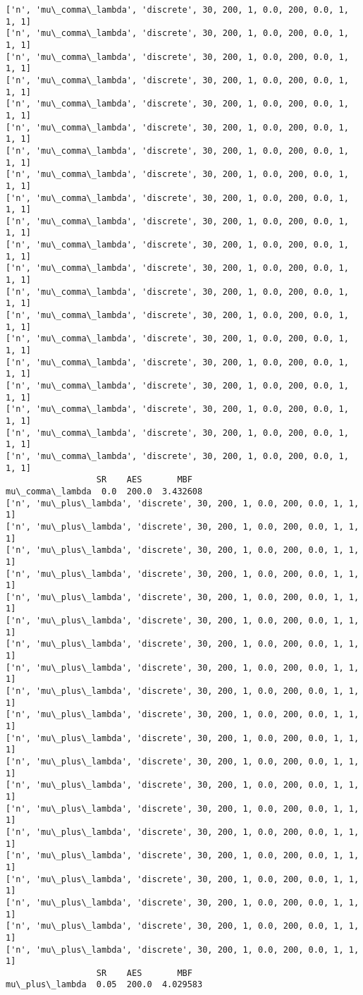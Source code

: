 \documentclass[11pt]{article}
\begin{document}
    \begin{Verbatim}[commandchars=\\\{\}]
['n', 'mu\_comma\_lambda', 'discrete', 30, 200, 1, 0.0, 200, 0.0, 1, 1, 1]
['n', 'mu\_comma\_lambda', 'discrete', 30, 200, 1, 0.0, 200, 0.0, 1, 1, 1]
['n', 'mu\_comma\_lambda', 'discrete', 30, 200, 1, 0.0, 200, 0.0, 1, 1, 1]
['n', 'mu\_comma\_lambda', 'discrete', 30, 200, 1, 0.0, 200, 0.0, 1, 1, 1]
['n', 'mu\_comma\_lambda', 'discrete', 30, 200, 1, 0.0, 200, 0.0, 1, 1, 1]
['n', 'mu\_comma\_lambda', 'discrete', 30, 200, 1, 0.0, 200, 0.0, 1, 1, 1]
['n', 'mu\_comma\_lambda', 'discrete', 30, 200, 1, 0.0, 200, 0.0, 1, 1, 1]
['n', 'mu\_comma\_lambda', 'discrete', 30, 200, 1, 0.0, 200, 0.0, 1, 1, 1]
['n', 'mu\_comma\_lambda', 'discrete', 30, 200, 1, 0.0, 200, 0.0, 1, 1, 1]
['n', 'mu\_comma\_lambda', 'discrete', 30, 200, 1, 0.0, 200, 0.0, 1, 1, 1]
['n', 'mu\_comma\_lambda', 'discrete', 30, 200, 1, 0.0, 200, 0.0, 1, 1, 1]
['n', 'mu\_comma\_lambda', 'discrete', 30, 200, 1, 0.0, 200, 0.0, 1, 1, 1]
['n', 'mu\_comma\_lambda', 'discrete', 30, 200, 1, 0.0, 200, 0.0, 1, 1, 1]
['n', 'mu\_comma\_lambda', 'discrete', 30, 200, 1, 0.0, 200, 0.0, 1, 1, 1]
['n', 'mu\_comma\_lambda', 'discrete', 30, 200, 1, 0.0, 200, 0.0, 1, 1, 1]
['n', 'mu\_comma\_lambda', 'discrete', 30, 200, 1, 0.0, 200, 0.0, 1, 1, 1]
['n', 'mu\_comma\_lambda', 'discrete', 30, 200, 1, 0.0, 200, 0.0, 1, 1, 1]
['n', 'mu\_comma\_lambda', 'discrete', 30, 200, 1, 0.0, 200, 0.0, 1, 1, 1]
['n', 'mu\_comma\_lambda', 'discrete', 30, 200, 1, 0.0, 200, 0.0, 1, 1, 1]
['n', 'mu\_comma\_lambda', 'discrete', 30, 200, 1, 0.0, 200, 0.0, 1, 1, 1]
                  SR    AES       MBF
mu\_comma\_lambda  0.0  200.0  3.432608
['n', 'mu\_plus\_lambda', 'discrete', 30, 200, 1, 0.0, 200, 0.0, 1, 1, 1]
['n', 'mu\_plus\_lambda', 'discrete', 30, 200, 1, 0.0, 200, 0.0, 1, 1, 1]
['n', 'mu\_plus\_lambda', 'discrete', 30, 200, 1, 0.0, 200, 0.0, 1, 1, 1]
['n', 'mu\_plus\_lambda', 'discrete', 30, 200, 1, 0.0, 200, 0.0, 1, 1, 1]
['n', 'mu\_plus\_lambda', 'discrete', 30, 200, 1, 0.0, 200, 0.0, 1, 1, 1]
['n', 'mu\_plus\_lambda', 'discrete', 30, 200, 1, 0.0, 200, 0.0, 1, 1, 1]
['n', 'mu\_plus\_lambda', 'discrete', 30, 200, 1, 0.0, 200, 0.0, 1, 1, 1]
['n', 'mu\_plus\_lambda', 'discrete', 30, 200, 1, 0.0, 200, 0.0, 1, 1, 1]
['n', 'mu\_plus\_lambda', 'discrete', 30, 200, 1, 0.0, 200, 0.0, 1, 1, 1]
['n', 'mu\_plus\_lambda', 'discrete', 30, 200, 1, 0.0, 200, 0.0, 1, 1, 1]
['n', 'mu\_plus\_lambda', 'discrete', 30, 200, 1, 0.0, 200, 0.0, 1, 1, 1]
['n', 'mu\_plus\_lambda', 'discrete', 30, 200, 1, 0.0, 200, 0.0, 1, 1, 1]
['n', 'mu\_plus\_lambda', 'discrete', 30, 200, 1, 0.0, 200, 0.0, 1, 1, 1]
['n', 'mu\_plus\_lambda', 'discrete', 30, 200, 1, 0.0, 200, 0.0, 1, 1, 1]
['n', 'mu\_plus\_lambda', 'discrete', 30, 200, 1, 0.0, 200, 0.0, 1, 1, 1]
['n', 'mu\_plus\_lambda', 'discrete', 30, 200, 1, 0.0, 200, 0.0, 1, 1, 1]
['n', 'mu\_plus\_lambda', 'discrete', 30, 200, 1, 0.0, 200, 0.0, 1, 1, 1]
['n', 'mu\_plus\_lambda', 'discrete', 30, 200, 1, 0.0, 200, 0.0, 1, 1, 1]
['n', 'mu\_plus\_lambda', 'discrete', 30, 200, 1, 0.0, 200, 0.0, 1, 1, 1]
['n', 'mu\_plus\_lambda', 'discrete', 30, 200, 1, 0.0, 200, 0.0, 1, 1, 1]
                  SR    AES       MBF
mu\_plus\_lambda  0.05  200.0  4.029583

    \end{Verbatim}
\end{document}
